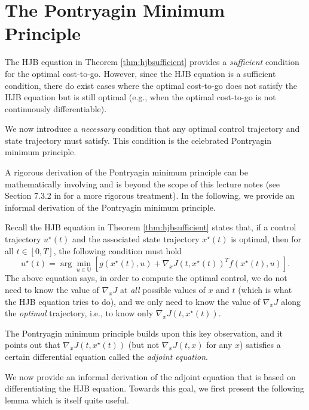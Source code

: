 \documentclass[
]{book}
\theoremstyle{definition}
\theoremstyle{definition}
\theoremstyle{definition}
\theoremstyle{definition}
\theoremstyle{remark}
\begin{document}
\hypertarget{the-pontryagin-minimum-principle}{%
\section{The Pontryagin Minimum Principle}\label{the-pontryagin-minimum-principle}}

The HJB equation in Theorem \ref{thm:hjbsufficient} provides a \emph{sufficient} condition for the optimal cost-to-go. However, since the HJB equation is a sufficient condition, there do exist cases where the optimal cost-to-go does not satisfy the HJB equation but is still optimal (e.g., when the optimal cost-to-go is not continuously differentiable).

We now introduce a \emph{necessary} condition that any optimal control trajectory and state trajectory must satisfy. This condition is the celebrated Pontryagin minimum principle.

A rigorous derivation of the Pontryagin minimum principle can be mathematically involving and is beyond the scope of this lecture notes (see Section 7.3.2 in \citep{bertsekas12book-dpocI} for a more rigorous treatment). In the following, we provide an informal derivation of the Pontryagin minimum principle.

Recall the HJB equation in Theorem \ref{thm:hjbsufficient} states that, if a control trajectory \(u^\star(t)\) and the associated state trajectory \(x^\star(t)\) is optimal, then for all \(t \in [0,T]\), the following condition must hold
\begin{equation}
u^\star(t) = \arg\min_{u \in \mathbb{U}} \left[ g(x^\star(t),u) + \nabla_x J(t,x^\star(t))^T f(x^\star(t),u)  \right] 
\label{eq:pmp-intro-from-hjb}.
\end{equation}
The above equation says, in order to compute the optimal control, we do not need to know the value of \(\nabla_x J\) at \emph{all} possible values of \(x\) and \(t\) (which is what the HJB equation tries to do), and we only need to know the value of \(\nabla_x J\) along the \emph{optimal} trajectory, i.e., to know only \(\nabla_x J(t,x^\star(t))\).

The Pontryagin minimum principle builds upon this key observation, and it points out that \(\nabla_x J(t,x^\star(t))\) (but not \(\nabla_x J(t,x)\) for any \(x\)) satisfies a certain differential equation called the \emph{adjoint equation}.

We now provide an informal derivation of the adjoint equation that is based on differentiating the HJB equation. Towards this goal, we first present the following lemma which is itself quite useful.
\end{document}
